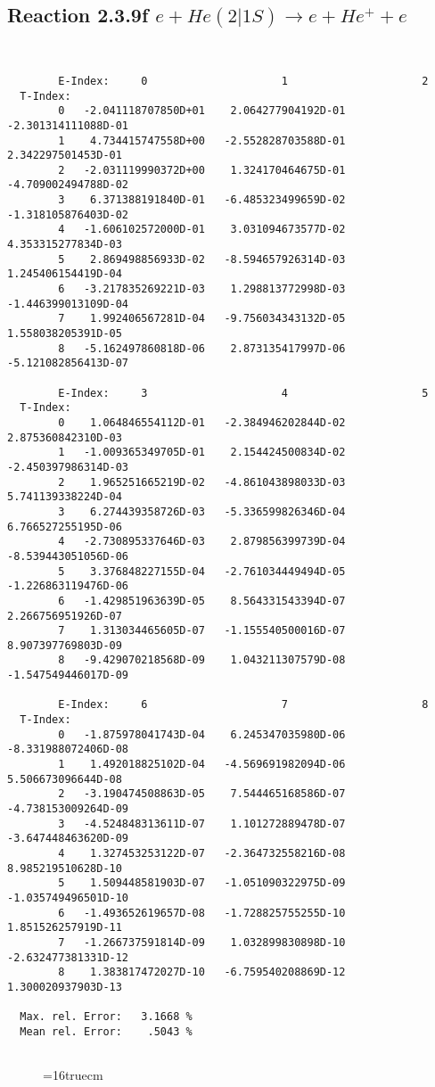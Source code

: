 \documentclass[12pt]{article}
\begin{document}
\subsection{
Reaction 2.3.9f  $e + He(2|1S) \rightarrow e + He^+ + e  $
}



\begin{small}\begin{verbatim}


        E-Index:     0                     1                     2
  T-Index:
        0   -2.041118707850D+01    2.064277904192D-01   -2.301314111088D-01
        1    4.734415747558D+00   -2.552828703588D-01    2.342297501453D-01
        2   -2.031119990372D+00    1.324170464675D-01   -4.709002494788D-02
        3    6.371388191840D-01   -6.485323499659D-02   -1.318105876403D-02
        4   -1.606102572000D-01    3.031094673577D-02    4.353315277834D-03
        5    2.869498856933D-02   -8.594657926314D-03    1.245406154419D-04
        6   -3.217835269221D-03    1.298813772998D-03   -1.446399013109D-04
        7    1.992406567281D-04   -9.756034343132D-05    1.558038205391D-05
        8   -5.162497860818D-06    2.873135417997D-06   -5.121082856413D-07

        E-Index:     3                     4                     5
  T-Index:
        0    1.064846554112D-01   -2.384946202844D-02    2.875360842310D-03
        1   -1.009365349705D-01    2.154424500834D-02   -2.450397986314D-03
        2    1.965251665219D-02   -4.861043898033D-03    5.741139338224D-04
        3    6.274439358726D-03   -5.336599826346D-04    6.766527255195D-06
        4   -2.730895337646D-03    2.879856399739D-04   -8.539443051056D-06
        5    3.376848227155D-04   -2.761034449494D-05   -1.226863119476D-06
        6   -1.429851963639D-05    8.564331543394D-07    2.266756951926D-07
        7    1.313034465605D-07   -1.155540500016D-07    8.907397769803D-09
        8   -9.429070218568D-09    1.043211307579D-08   -1.547549446017D-09

        E-Index:     6                     7                     8
  T-Index:
        0   -1.875978041743D-04    6.245347035980D-06   -8.331988072406D-08
        1    1.492018825102D-04   -4.569691982094D-06    5.506673096644D-08
        2   -3.190474508863D-05    7.544465168586D-07   -4.738153009264D-09
        3   -4.524848313611D-07    1.101272889478D-07   -3.647448463620D-09
        4    1.327453253122D-07   -2.364732558216D-08    8.985219510628D-10
        5    1.509448581903D-07   -1.051090322975D-09   -1.035749496501D-10
        6   -1.493652619657D-08   -1.728825755255D-10    1.851526257919D-11
        7   -1.266737591814D-09    1.032899830898D-10   -2.632477381331D-12
        8    1.383817472027D-10   -6.759540208869D-12    1.300020937903D-13

  Max. rel. Error:   3.1668 %
  Mean rel. Error:    .5043 %


\end{verbatim}\end{small}
\begin{figure} \label{2.3.9f}
\epsfxsize=16truecm
\end{figure}
\newpage
\end{document}
